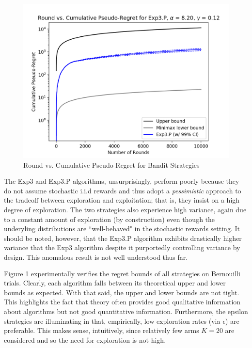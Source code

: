 \documentclass[12pt]{article}
\begin{document}
\begin{figure}[H]
\begin{minipage}[h]{0.5\linewidth}
\end{minipage}
\begin{minipage}[h]{0.5\linewidth}
\includegraphics[width=\linewidth, height=0.75\linewidth]{exp3P-2.png}
\end{minipage}
\captionsetup{justification=centering}
\caption{Round vs. Cumulative Pseudo-Regret for Bandit Strategies}
\label{fig:stochastic-rewards-2}
\end{figure}

The Exp3 and Exp3.P algorithms, unsurprisingly, perform poorly because they do not assume stochastic i.i.d rewards and thus adopt a \textit{pessimistic} approach to the tradeoff between exploration and exploitation; that is, they insist on a high degree of exploration. The two strategies also experience high variance, again due to a constant amount of exploration (by construction) even though the underyling distributions are ``well-behaved" in the stochastic rewards setting. It should be noted, however, that the Exp3.P algorithm exhibits drastically higher variance that the Exp3 algorithm despite it purportedly controlling variance by design. This anomalous result is not well understood thus far.

Figure \ref{fig:stochastic-rewards-2} experimentally verifies the regret bounds of all strategies on Bernouilli trials. Clearly, each algorithm falls between its theoretical upper and lower bounds as expected. With that said, the upper and lower bounds are not tight. This highlights the fact that theory often provides good qualitative information about algorithms but not good quantitative information. Furthermore, the epsilon strategies are illuminating in that, empirically, low exploration rates (via $\epsilon$) are preferable. This makes sense, intuitively, since relatively few arms $K=20$ are considered and so the need for exploration is not high.
\end{document}
